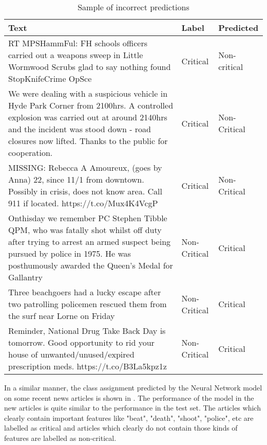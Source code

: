 \begin{table}
\begin{center}
\caption{Sample of incorrect predictions}
\label{tbl:incorrect_predictions}
\begin{tabular}{p{10cm}p{2cm}p{2cm}}
\toprule 
Text&Label&Predicted\\
\midrule 
RT MPSHammFul: FH schools officers carried out a weapons sweep in Little Wormwood Scrubs glad to say nothing found StopKnifeCrime OpSce&Critical&Non-critical\\
\hline
We were dealing with a suspicious vehicle in Hyde Park Corner from 2100hrs. A controlled explosion was carried out at around 2140hrs and the incident was stood down - road closures now lifted. Thanks to the public for cooperation.&Critical&Non-Critical\\
\hline
MISSING:  Rebecca A Amoureux, (goes by Anna) 22, since 11/1 from downtown. Possibly in crisis, does not know area.  Call 911 if located. https://t.co/Mux4K4VcgP&Critical&Non-Critical\\
\hline
Onthisday we remember PC Stephen Tibble QPM, who was fatally shot whilst off duty after trying to arrest an armed suspect being pursued by police in 1975. He was posthumously awarded the Queen’s Medal for Gallantry&Non-Critical&Critical\\
\hline
Three beachgoers had a lucky escape after two patrolling policemen rescued them from the surf near Lorne on Friday&Non-Critical&Critical\\
\hline
Reminder, National Drug Take Back Day is tomorrow.  Good opportunity to rid your house of unwanted/unused/expired prescription meds. https://t.co/B3La5kpz1z&Non-Critical&Critical\\
\bottomrule
\end{tabular}
\end{center}
\end{table}

In a similar manner, the class assignment predicted by the Neural Network model on some recent news articles is shown in . The performance of the model in the new articles is quite similar to the performance in the test set. The articles which clearly contain important features like "beat", "death", "shoot", "police", etc are labelled as critical and articles which clearly do not contain those kinds of features are labelled as non-critical.

